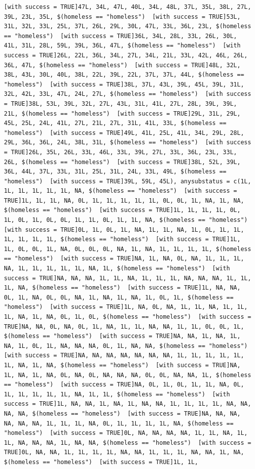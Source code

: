 \documentclass{tufte-book}\usepackage[]{graphicx}\usepackage[]{xcolor}
\makeatletter
\newenvironment{kframe}{%
 \def\at@end@of@kframe{}%
 \ifinner\ifhmode%
  \def\at@end@of@kframe{\end{minipage}}%
  \begin{minipage}{\columnwidth}%
 \fi\fi%
 \def\FrameCommand##1{\hskip\@totalleftmargin \hskip-\fboxsep
 \colorbox{shadecolor}{##1}\hskip-\fboxsep
     \hskip-\linewidth \hskip-\@totalleftmargin \hskip\columnwidth}%
 \MakeFramed {\advance\hsize-\width
   \@totalleftmargin\z@ \linewidth\hsize
   \@setminipage}}%
 {\par\unskip\endMakeFramed%
 \at@end@of@kframe}
\newenvironment{knitrout}{}{} %
\makeatother
\begin{document}
\begin{knitrout}
\begin{kframe}
\begin{verbatim}
[with success = TRUE]47L, 34L, 47L, 40L, 34L, 48L, 37L, 35L, 38L, 27L, 39L, 23L, 35L, $(homeless == "homeless")  [with success = TRUE]53L, 31L, 32L, 33L, 25L, 37L, 26L, 29L, 30L, 47L, 33L, 36L, 23L, $(homeless == "homeless")  [with success = TRUE]36L, 34L, 28L, 33L, 26L, 30L, 41L, 31L, 28L, 59L, 39L, 36L, 47L, $(homeless == "homeless")  [with success = TRUE]26L, 22L, 36L, 34L, 27L, 34L, 21L, 33L, 42L, 46L, 26L, 36L, 47L, $(homeless == "homeless")  [with success = TRUE]48L, 32L, 38L, 43L, 30L, 40L, 38L, 22L, 39L, 22L, 37L, 37L, 44L, $(homeless == "homeless")  [with success = TRUE]38L, 37L, 43L, 39L, 45L, 39L, 31L, 32L, 42L, 33L, 47L, 24L, 27L, $(homeless == "homeless")  [with success = TRUE]38L, 53L, 39L, 32L, 27L, 43L, 31L, 41L, 27L, 28L, 39L, 39L, 21L, $(homeless == "homeless")  [with success = TRUE]29L, 31L, 29L, 45L, 25L, 24L, 41L, 27L, 21L, 27L, 31L, 41L, 33L, $(homeless == "homeless")  [with success = TRUE]49L, 41L, 25L, 41L, 34L, 29L, 28L, 29L, 36L, 36L, 24L, 38L, 31L, $(homeless == "homeless")  [with success = TRUE]26L, 35L, 26L, 33L, 46L, 33L, 39L, 27L, 33L, 36L, 23L, 33L, 26L, $(homeless == "homeless")  [with success = TRUE]38L, 52L, 39L, 36L, 44L, 37L, 33L, 31L, 25L, 31L, 24L, 33L, 49L, $(homeless == "homeless")  [with success = TRUE]39L, 59L, 45L), anysubstatus = c(1L, 1L, 1L, 1L, 1L, 1L, NA, $(homeless == "homeless")  [with success = TRUE]1L, 1L, 1L, NA, 0L, 1L, 1L, 1L, 1L, 1L, 0L, 0L, 1L, NA, 1L, NA, $(homeless == "homeless")  [with success = TRUE]1L, 1L, 1L, 1L, 0L, 1L, 0L, 1L, 0L, 0L, 1L, 1L, 0L, 1L, 1L, NA, $(homeless == "homeless")  [with success = TRUE]0L, 1L, 0L, 1L, NA, 1L, 1L, NA, 1L, 0L, 1L, 1L, 1L, 1L, 1L, 1L, $(homeless == "homeless")  [with success = TRUE]1L, 1L, 0L, 0L, 1L, NA, 0L, 0L, 0L, NA, 1L, NA, 1L, 1L, 1L, 1L, $(homeless == "homeless")  [with success = TRUE]NA, 1L, NA, 0L, NA, 1L, 1L, 1L, NA, 1L, 1L, 1L, 1L, 1L, NA, 1L, $(homeless == "homeless")  [with success = TRUE]NA, NA, NA, 1L, 1L, NA, 1L, 1L, 1L, NA, NA, NA, 1L, 1L, 1L, NA, $(homeless == "homeless")  [with success = TRUE]1L, NA, NA, 0L, 1L, NA, 0L, 0L, NA, 1L, NA, 1L, NA, 1L, 0L, 1L, $(homeless == "homeless")  [with success = TRUE]1L, NA, 0L, NA, 1L, 1L, NA, 1L, 1L, 1L, NA, 1L, NA, 0L, 1L, 0L, $(homeless == "homeless")  [with success = TRUE]NA, NA, 0L, NA, 0L, 1L, NA, 1L, 1L, NA, NA, 1L, 1L, 0L, 0L, 1L, $(homeless == "homeless")  [with success = TRUE]NA, NA, 1L, NA, 1L, NA, 1L, 0L, 1L, NA, NA, NA, 0L, 1L, NA, NA, $(homeless == "homeless")  [with success = TRUE]NA, NA, NA, NA, NA, NA, NA, 1L, 1L, 1L, 1L, 1L, 1L, NA, 1L, NA, $(homeless == "homeless")  [with success = TRUE]NA, 1L, NA, 1L, NA, 0L, NA, 0L, NA, NA, NA, 0L, 0L, NA, NA, 1L, $(homeless == "homeless")  [with success = TRUE]NA, 0L, 1L, 0L, 1L, 1L, NA, 0L, 1L, 1L, 1L, 1L, 1L, NA, 1L, 1L, $(homeless == "homeless")  [with success = TRUE]1L, NA, NA, 1L, NA, 1L, NA, NA, 1L, 1L, 1L, 1L, NA, NA, NA, NA, $(homeless == "homeless")  [with success = TRUE]NA, NA, NA, NA, NA, NA, 1L, 1L, 1L, NA, 0L, 1L, 1L, 1L, 1L, NA, $(homeless == "homeless")  [with success = TRUE]0L, NA, NA, NA, NA, 1L, 1L, NA, 1L, 1L, NA, NA, NA, 1L, NA, NA, $(homeless == "homeless")  [with success = TRUE]0L, NA, NA, 1L, 1L, 1L, 1L, NA, NA, 1L, 1L, 1L, NA, NA, 1L, NA, $(homeless == "homeless")  [with success = TRUE]1L, 1L, 
\end{verbatim}
\end{kframe}
\end{knitrout}
\end{document}
